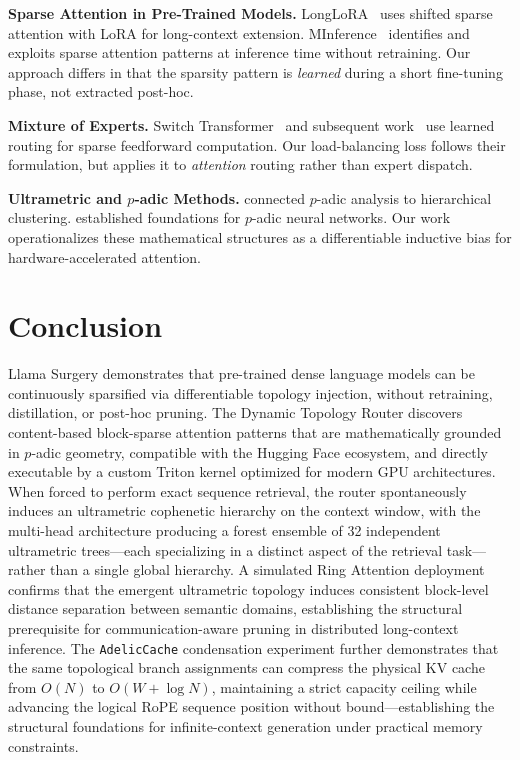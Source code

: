 \documentclass[11pt,a4paper]{article}
\begin{document}
\textbf{Sparse Attention in Pre-Trained Models.} LongLoRA~\citep{chen2024longlora} uses shifted sparse attention with LoRA for long-context extension. MInference~\citep{jiang2024minference} identifies and exploits sparse attention patterns at inference time without retraining. Our approach differs in that the sparsity pattern is \emph{learned} during a short fine-tuning phase, not extracted post-hoc.

\textbf{Mixture of Experts.} Switch Transformer~\citep{fedus2022switch} and subsequent work~\citep{jiang2024mixtral} use learned routing for sparse feedforward computation. Our load-balancing loss follows their formulation, but applies it to \emph{attention} routing rather than expert dispatch.

\textbf{Ultrametric and $p$-adic Methods.} \citet{bradley2010mumford} connected $p$-adic analysis to hierarchical clustering. \citet{khrennikov2004padic} established foundations for $p$-adic neural networks. Our work operationalizes these mathematical structures as a differentiable inductive bias for hardware-accelerated attention.

\section{Conclusion}

Llama Surgery demonstrates that pre-trained dense language models can be continuously sparsified via differentiable topology injection, without retraining, distillation, or post-hoc pruning. The Dynamic Topology Router discovers content-based block-sparse attention patterns that are mathematically grounded in $p$-adic geometry, compatible with the Hugging Face ecosystem, and directly executable by a custom Triton kernel optimized for modern GPU architectures. When forced to perform exact sequence retrieval, the router spontaneously induces an ultrametric cophenetic hierarchy on the context window, with the multi-head architecture producing a forest ensemble of 32 independent ultrametric trees---each specializing in a distinct aspect of the retrieval task---rather than a single global hierarchy. A simulated Ring Attention deployment confirms that the emergent ultrametric topology induces consistent block-level distance separation between semantic domains, establishing the structural prerequisite for communication-aware pruning in distributed long-context inference. The \texttt{AdelicCache} condensation experiment further demonstrates that the same topological branch assignments can compress the physical KV cache from $O(N)$ to $O(W + \log N)$, maintaining a strict capacity ceiling while advancing the logical RoPE sequence position without bound---establishing the structural foundations for infinite-context generation under practical memory constraints.
\end{document}
